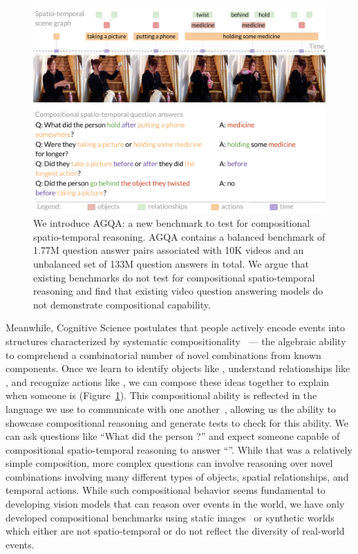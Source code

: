 \begin{figure}[t]
    \centering
    \includegraphics[width=\columnwidth]{figures/pull.pdf}
    \caption{We introduce AGQA: a new benchmark to test for compositional spatio-temporal reasoning. AGQA contains a balanced benchmark of 1.77M question answer pairs associated with 10K videos and an unbalanced set of 133M question answers in total. We argue that existing benchmarks do not test for compositional spatio-temporal reasoning and find that existing video question answering models do not demonstrate compositional capability.}
    \label{fig:pull}
\end{figure}

Meanwhile, Cognitive Science postulates that people actively encode events into structures characterized by systematic compositionality~\cite{michotte2017perception,barker1951one,zacks2001perceiving} --- the algebraic ability to comprehend a combinatorial number of novel combinations from known components. Once we learn to identify objects like , understand relationships like , and recognize actions like , we can compose these ideas together to explain when someone is      (Figure~\ref{fig:pull}). This compositional ability is reflected in the language we use to communicate with one another~\cite{chomsky2002syntactic,montague1970universal}, allowing us the ability to showcase compositional reasoning and generate tests to check for this ability. We can ask questions like ``What did the person   ?'' and expect someone capable of compositional spatio-temporal reasoning to answer ``''. While
that was a relatively simple composition, more complex questions can involve reasoning over novel combinations involving many different types of objects, spatial relationships, and temporal actions. While such compositional behavior seems fundamental to developing vision models that can reason over events in the world, we have only developed compositional benchmarks using static images~\cite{hudson2019gqa} or synthetic worlds~\cite{lake2018generalization,yi2019clevrer} which either are not spatio-temporal or do not reflect the diversity of real-world events.

